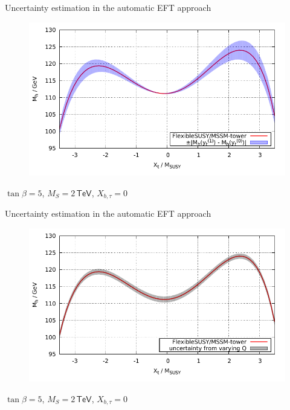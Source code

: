 \documentclass[hyperref={pdfpagelabels=false},ngerman]{beamer}
\newcommand{\eh}[1]{\,\mathsf{#1}}
\begin{document}
\begin{frame}{Uncertainty estimation in the automatic EFT approach}
  \begin{figure}
    \centering
    \includegraphics[width=\textwidth]{plots/xt_MSSM_MS-2000_tower}
  \end{figure}
  $\tan\beta = 5$, $M_S = 2\eh{TeV}$, $X_{b,\tau} = 0$
\end{frame}

\begin{frame}{Uncertainty estimation in the automatic EFT approach}
  \begin{figure}
    \centering
    \includegraphics[width=\textwidth]{plots/xt_MSSM_MS-2000_tower_scale_uncertainty}
  \end{figure}
  $\tan\beta = 5$, $M_S = 2\eh{TeV}$, $X_{b,\tau} = 0$
\end{frame}
\end{document}

